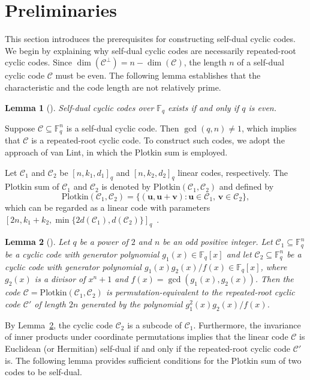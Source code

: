 \documentclass[10pt,a4paper]{amsart}
\newtheorem{lemma}{Lemma}
\begin{document}
\section{Preliminaries}
\label{2}
This section introduces the prerequisites for constructing self-dual cyclic codes. We begin by explaining why self-dual cyclic codes are necessarily repeated-root cyclic codes. Since $\dim(\mathcal{C}^\perp) = n - \dim(\mathcal{C})$, the length $n$ of a self-dual cyclic code $\mathcal{C}$ must be even. The following lemma establishes that the characteristic and the code length are not relatively prime.

\begin{lemma}[\cite{2008On}]
    Self-dual cyclic codes over $\mathbb{F}_q$ exists if and only if $q$ is even.
\end{lemma}

Suppose $\mathcal{C} \subseteq \mathbb{F}_q^n$ is a self-dual cyclic code. Then $\gcd(q,n) \ne 1$, which implies that $\mathcal{C}$ is a repeated-root cyclic code. To construct such codes, we adopt the approach of van Lint, in which the Plotkin sum is employed.

Let $\mathcal{C}_1$ and $\mathcal{C}_2$ be $[n,k_1,d_1]_q$ and $[n,k_2,d_2]_q$ linear codes, respectively.
The Plotkin sum of $\mathcal{C}_1$ and $\mathcal{C}_2$ is denoted by $\text{Plotkin}(\mathcal{C}_1,\mathcal{C}_2)$ and defined by
\[
\text{Plotkin}(\mathcal{C}_1,\mathcal{C}_2)=\{(\textbf{u},\textbf{u}+\textbf{v}):\textbf{u}\in \mathcal{C}_1,\,\textbf{v}\in\mathcal{C}_2\},
\]
which can be regarded as a linear code with parameters $[2n,k_1+k_2,\min\{2d(\mathcal{C}_1),d(\mathcal{C}_2)\}]_q$~\cite{MacWilliamsSloane1977}.

\begin{lemma}[\cite{10856234}]
\label{van lint}
    Let $q$ be a power of $2$ and $n$ be an odd positive integer. Let $\mathcal{C}_1\subseteq\mathbb{F}_q^n$ be a cyclic code with generator polynomial $g_1(x)\in\mathbb{F}_q[x]$ and let $\mathcal{C}_2\subseteq\mathbb{F}_q^n$ be a cyclic code with generator polynomial $g_1(x)g_2(x)/f(x)\in\mathbb{F}_q[x]$, where $g_2(x)$ is a divisor of $x^n+1$ and $f(x)=\gcd(g_1(x),g_2(x))$. Then the code $\mathcal{C}=\text{Plotkin}(\mathcal{C}_1,\mathcal{C}_2)$ is permutation-equivalent to the repeated-root cyclic code $\mathcal{C}'$ of length $2n$ generated by the polynomial $g_1^2(x)g_2(x)/f(x)$.
\end{lemma}

By Lemma~\ref{van lint}, the cyclic code $\mathcal{C}_2$ is a subcode of $\mathcal{C}_1$. Furthermore, the invariance of inner products under coordinate permutations implies that the linear code $\mathcal{C}$ is Euclidean (or Hermitian) self-dual if and only if the repeated-root cyclic code $\mathcal{C}'$ is. The following lemma provides sufficient conditions for the Plotkin sum of two codes to be self-dual.
\end{document}
